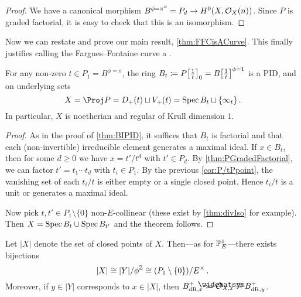 \begin{proof}
	We have a canonical morphism $B^{\phi=\pi^d}=P_d\morphism H^0(X,\Oo_X(n))$. Since $P$ is graded factorial, it is easy to check that this is an isomorphism.
\end{proof}
Now we can restate and prove our main result, \cref{thm:FFCisACurve}. This finally justifies calling the Fargues--Fontaine curve a .
\begin{mainthm}\label{thm:FFCisACurveII}
	For any non-zero $t\in P_1=B^{\phi=\pi}$, the ring $B_t\coloneqq P\localize{t}_0=B\localize{t}^{\phi=1}$ is a PID, and on underlying sets
	\begin{equation*}
		X=\Proj P=D_+(t)\sqcup V_+(t)=\Spec B_t\sqcup \{\infty_t\}\,.
	\end{equation*}
	In particular, $X$ is noetherian and regular of Krull dimension $1$.
\end{mainthm}
\begin{proof}
	As in the proof of \cref{thm:BIPID}, it suffices that $B_t$ is factorial and that each (non-invertible) irreducible element generates a maximal ideal. If $x\in B_t$, then for some $d\geq 0$ we have $x=t'/t^d$ with $t'\in P_d$. By \cref{thm:PGradedFactorial}, we can factor $t'=t_1\dotsm t_d$ with $t_i\in P_1$. By the previous \cref{cor:P/tPpoint}, the vanishing set of each $t_i/t$ is either empty or a single closed point. Hence $t_i/t$ is a unit or generates a maximal ideal.
	
	Now pick $t,t'\in P_1\setminus \{0\}$ non-$E$-collinear (these exist by \cref{thm:divIso} for example). Then $X=\operatorname{Spec} B_t\cup \operatorname{Spec} B_{t'}$ and the theorem follows.
\end{proof}
\begin{lem}\label{lem:BdRx}
	Let $|X|$ denote the set of closed points of $X$. Then---as for $\mathbb{P}_E^1$---there exists bijections
	\begin{equation*}
		|X|\cong |Y|/\phi^\IZ \cong (P_1\setminus\{0\})/E^\times\,.
	\end{equation*}
	Moreover, if $y\in |Y|$ corresponds to $x\in |X|$, then $B_{\dR,x}^+\coloneqq \roof{\Oo}_{X,x}\cong B_{\dR,y}^+$.
\end{lem}
